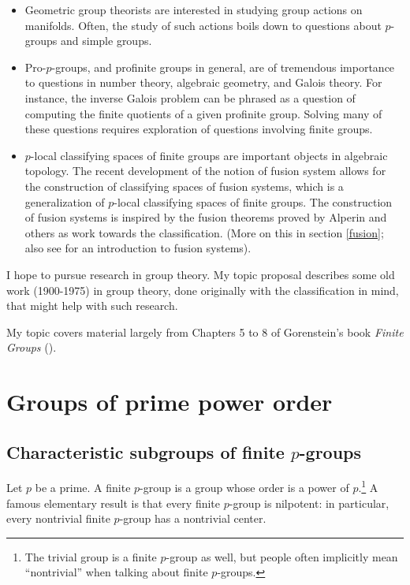 \documentclass{amsart}
\begin{document}
\begin{itemize}

\item Geometric group theorists are interested in studying group
  actions on manifolds. Often, the study of such actions boils down to
  questions about $p$-groups and simple groups.

\item Pro-$p$-groups, and profinite groups in general, are of
  tremendous importance to questions in number theory, algebraic
  geometry, and Galois theory. For instance, the inverse Galois
  problem can be phrased as a question of computing the finite
  quotients of a given profinite group. Solving many of these
  questions requires exploration of questions involving finite groups.

\item $p$-local classifying spaces of finite groups are important
  objects in algebraic topology. The recent development of the notion
  of fusion system allows for the construction of classifying spaces
  of fusion systems, which is a generalization of $p$-local
  classifying spaces of finite groups. The construction of fusion
  systems is inspired by the fusion theorems proved by Alperin and
  others as work towards the classification. (More on this in section
  \ref{fusion}; also see \cite{fusionintro} for an introduction to
  fusion systems).

\end{itemize}

I hope to pursue research in group theory. My topic proposal
describes some old work (1900-1975) in group theory, done originally
with the classification in mind, that might help with such research.


My topic covers material largely from Chapters 5 to 8 of Gorenstein's
book  {\em Finite Groups} (\cite{gorenstein}).

\section{Groups of prime power order}

\subsection{Characteristic subgroups of finite $p$-groups}

Let $p$ be a prime. A finite $p$-group is a group whose order is a
power of $p$.\footnote{The trivial group is a finite $p$-group as
  well, but people often implicitly mean ``nontrivial'' when talking
  about finite $p$-groups.} A famous elementary result is that every
finite $p$-group is nilpotent: in particular, every nontrivial finite
$p$-group has a nontrivial center.
\end{document}
